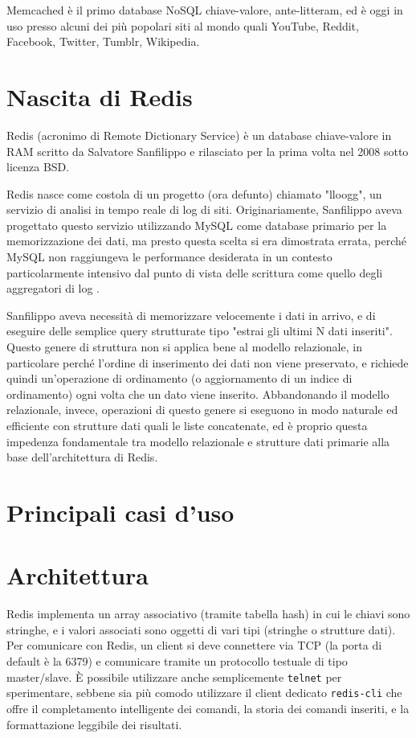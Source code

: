 Memcached è il primo database NoSQL chiave-valore, ante-litteram, ed è oggi in uso presso alcuni
dei più popolari siti al mondo quali YouTube, Reddit, Facebook, Twitter, Tumblr, Wikipedia.


\section{Nascita di Redis}

Redis (acronimo di Remote Dictionary Service) è un database chiave-valore in RAM scritto
da Salvatore Sanfilippo e rilasciato per la prima volta nel 2008 sotto licenza BSD.

Redis nasce come costola di un progetto (ora defunto) chiamato "lloogg", un servizio di
analisi in tempo reale di log di siti. Originariamente, Sanfilippo aveva progettato
questo servizio  utilizzando MySQL come database primario per la memorizzazione dei
dati, ma presto questa scelta si era dimostrata errata, perché MySQL non raggiungeva le
performance desiderata in un contesto particolarmente intensivo dal punto di vista delle
scrittura come quello degli aggregatori di log \cite{nascita}.

Sanfilippo aveva necessità di memorizzare velocemente i dati in arrivo, e di eseguire
delle semplice query strutturate tipo "estrai gli ultimi N dati inseriti". Questo genere
di struttura non si applica bene al modello relazionale, in particolare perché l'ordine
di inserimento dei dati non viene preservato, e richiede quindi un'operazione di ordinamento
(o aggiornamento di un indice di ordinamento) ogni volta che un dato viene inserito.
Abbandonando il modello relazionale, invece, operazioni di questo genere si eseguono
in modo naturale ed efficiente con strutture dati quali le liste concatenate, ed è
proprio questa impedenza fondamentale tra modello relazionale e strutture dati primarie
alla base dell'architettura di Redis.

\section{Principali casi d'uso}

\section{Architettura}

Redis implementa un array associativo (tramite tabella hash) in cui le chiavi sono
stringhe, e i valori associati sono oggetti di vari tipi (stringhe o strutture dati).
Per comunicare con Redis, un client si deve connettere via TCP (la porta di default è la 6379) e
comunicare tramite un protocollo testuale di tipo master/slave. È possibile utilizzare
anche semplicemente \verb|telnet| per sperimentare, sebbene sia più comodo utilizzare il
client dedicato \verb|redis-cli| che offre il completamento intelligente dei comandi, la
storia dei comandi inseriti, e la formattazione leggibile dei risultati.

